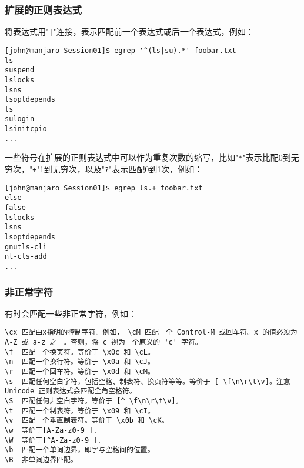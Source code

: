 \subsubsection{扩展的正则表达式}
将表达式用"\texttt{|}"连接，表示匹配前一个表达式或后一个表达式，例如：
\begin{lstlisting}[frame=none]
[john@manjaro Session01]$ egrep '^(ls|su).*' foobar.txt 
ls
suspend
lslocks
lsns
lsoptdepends
ls
sulogin
lsinitcpio
...
\end{lstlisting}
一些符号在扩展的正则表达式中可以作为重复次数的缩写，比如"\texttt{*}"表示比配0到无穷次，"\texttt{+}"1到无穷次，以及"\texttt{?}"表示匹配0到1次，例如：
\begin{lstlisting}[frame=none]
[john@manjaro Session01]$ egrep ls.+ foobar.txt 
else
false
lslocks
lsns
lsoptdepends
gnutls-cli
nl-cls-add
...
\end{lstlisting}
\subsubsection{非正常字符}
有时会匹配一些非正常字符，例如：
\begin{lstlisting}[frame=none]
\cx	匹配由x指明的控制字符。例如， \cM 匹配一个 Control-M 或回车符。x 的值必须为 A-Z 或 a-z 之一。否则，将 c 视为一个原义的 'c' 字符。
\f	匹配一个换页符。等价于 \x0c 和 \cL。
\n	匹配一个换行符。等价于 \x0a 和 \cJ。
\r	匹配一个回车符。等价于 \x0d 和 \cM。
\s	匹配任何空白字符，包括空格、制表符、换页符等等。等价于 [ \f\n\r\t\v]。注意 Unicode 正则表达式会匹配全角空格符。
\S	匹配任何非空白字符。等价于 [^ \f\n\r\t\v]。
\t	匹配一个制表符。等价于 \x09 和 \cI。
\v	匹配一个垂直制表符。等价于 \x0b 和 \cK。
\w  等价于[A-Za-z0-9_].
\W  等价于[^A-Za-z0-9_].
\b	匹配一个单词边界，即字与空格间的位置。
\B	非单词边界匹配。
\end{lstlisting}
